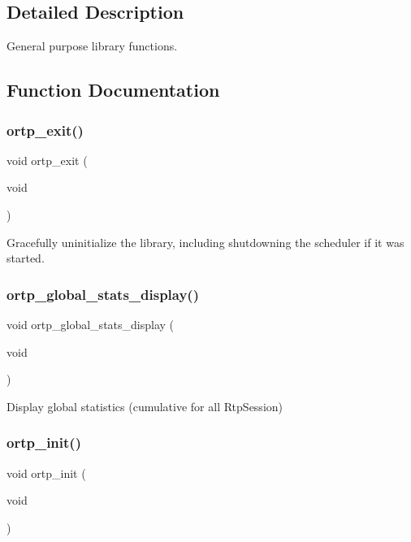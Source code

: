 \subsection{Detailed Description}
General purpose library functions. 



\subsection{Function Documentation}
\mbox{\label{ortp_8h_abb4e3cb949ec64f2ff4a50c093d86852}} 
\subsubsection{ortp\+\_\+exit()}
{\footnotesize\ttfamily void ortp\+\_\+exit (\begin{DoxyParamCaption}\item[{void}]{ }\end{DoxyParamCaption})}

Gracefully uninitialize the library, including shutdowning the scheduler if it was started. \mbox{\label{ortp_8h_ad2233a20047fbd0912caad6dc2e1291e}} 
\subsubsection{ortp\+\_\+global\+\_\+stats\+\_\+display()}
{\footnotesize\ttfamily void ortp\+\_\+global\+\_\+stats\+\_\+display (\begin{DoxyParamCaption}\item[{void}]{ }\end{DoxyParamCaption})}

Display global statistics (cumulative for all Rtp\+Session) \mbox{\label{ortp_8h_ab415c0a8f20298e82e76dcea13a745b5}} 
\subsubsection{ortp\+\_\+init()}
{\footnotesize\ttfamily void ortp\+\_\+init (\begin{DoxyParamCaption}\item[{void}]{ }\end{DoxyParamCaption})}

